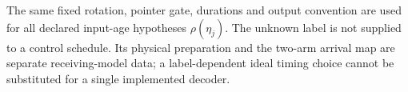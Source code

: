 The same fixed rotation, pointer gate, durations and output convention are
used for all declared input-age hypotheses $\rho(\eta_j)$. The unknown
label is not supplied to a control schedule. Its physical preparation and
the two-arm arrival map are separate receiving-model data; a
label-dependent ideal timing choice cannot be substituted for a single
implemented decoder.

